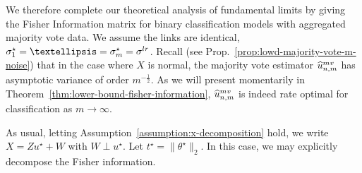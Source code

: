 \documentclass[11pt]{article}
\newcommand{\what}[1]{\widehat{#1}}
\newcommand{\lr}{^{\textup{lr}}}
\newcommand{\mv}{^{\textup{mv}}}
\newcommand{\norms}[1]{\|{#1}\|} %
\newcommand{\ltwos}[1]{\norms{#1}_2} %
\newcommand{\<}{\langle} %
\renewcommand{\>}{\rangle}
\newcommand{\half}{\frac{1}{2}}
\newcommand{\opt}{^\star}
\begin{document}
We therefore complete our theoretical analysis of fundamental limits by
giving the Fisher Information matrix for binary classification models with
aggregated majority vote data. We assume the links are identical,
$\sigma_1\opt = \dots = \sigma_m\opt = \sigma\lr$.  Recall (see
Prop.~\ref{prop:lowd-majority-vote-m-noise}) that in the case where $X$ is
normal, the majority vote estimator $\what{u}\mv_{n,m}$ has asymptotic
variance of order $m^{-\half}$. As we will present momentarily in
Theorem~\ref{thm:lower-bound-fisher-information}, $\what{u}\mv_{n,m}$ is
indeed rate optimal for classification as $m \to \infty$.

As usual, letting Assumption~\ref{assumption:x-decomposition} hold, we write
$X = Z u\opt + W$ with $ W \perp u\opt$. Let $t\opt = \ltwos{\theta\opt}$.
In this case, we may explicitly decompose the Fisher information.
\end{document}
